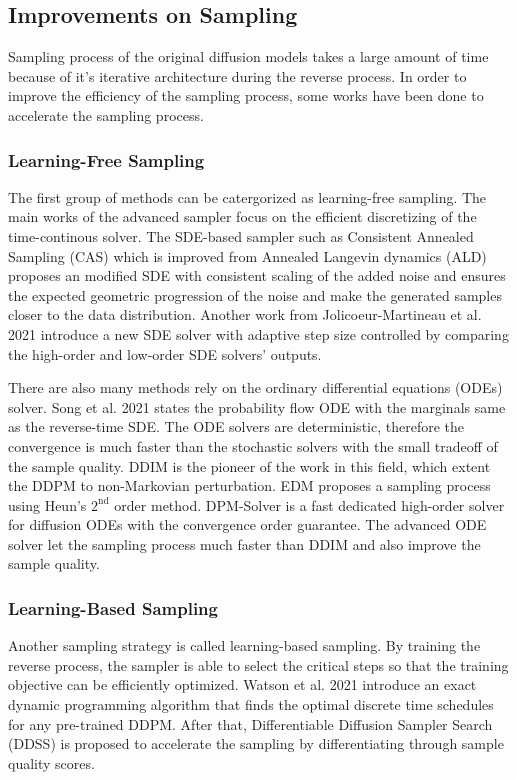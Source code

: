 \documentclass[12pt,DIV14,BCOR12mm,a4paper,footinclude=false,headinclude,parskip=half-,twoside,openright,cleardoublepage=empty,toc=index,bibliography=totoc,listof=totoc]{scrreprt}
\numberwithin{equation}{chapter}
\begin{document}
\subsection{Improvements on Sampling}

Sampling process of the original diffusion models takes a large amount of time because of it's iterative architecture during the reverse process. In order to improve the efficiency of the sampling process, some works have been done to accelerate the sampling process.
\subsubsection{Learning-Free Sampling}
The first group of methods can be catergorized as learning-free sampling. The main works of the advanced sampler focus on the efficient discretizing of the time-continous solver. The SDE-based sampler such as Consistent Annealed Sampling (CAS) \cite{jolicoeurmartineau2020adversarial} which is improved from Annealed Langevin dynamics (ALD) \cite{dockhorn2022scorebased} proposes an modified SDE with consistent scaling of the added noise and ensures the expected geometric progression of the noise and make the generated samples closer to the data distribution. Another work from Jolicoeur-Martineau et al. 2021 \cite{jolicoeurmartineau2021gotta} introduce a new SDE solver with adaptive step size controlled by comparing the high-order and low-order SDE solvers' outputs.

There are also many methods rely on the ordinary differential equations (ODEs) solver. Song et al. 2021 \cite{song2021scorebased} states the probability flow ODE with the marginals same as the reverse-time SDE. The ODE solvers are deterministic, therefore the convergence is much faster than the stochastic solvers with the small tradeoff of the sample quality. DDIM \cite{song2022denoising} is the pioneer of the work in this field, which extent the DDPM to non-Markovian perturbation. EDM proposes a sampling process using Heun's $2^{\text{nd}}$ order method. DPM-Solver \cite{lu2022dpmsolver} is a fast dedicated high-order solver for diffusion ODEs with the convergence order guarantee. The advanced ODE solver let the sampling process much faster than DDIM and also improve the sample quality.

\subsubsection{Learning-Based Sampling}
Another sampling strategy is called learning-based sampling. By training the reverse process, the sampler is able to select the critical steps so that the training objective can be efficiently optimized. Watson et al. 2021 \cite{watson2021learning} introduce an exact dynamic programming algorithm that finds the optimal discrete time schedules for any pre-trained DDPM. After that, Differentiable Diffusion Sampler Search (DDSS) \cite{watson2022learning} is proposed to accelerate the sampling by differentiating through sample quality scores. 
\end{document}
